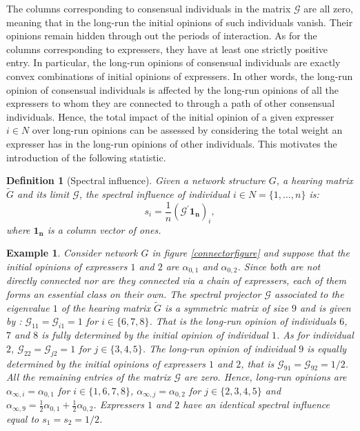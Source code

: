 \documentclass{article}
\newtheorem{definition}{Definition}
\newtheorem{example}{Example}
\begin{document}
\vspace{3mm} 
The columns corresponding to consensual individuals in the matrix $\mathcal{G}$ are all zero, meaning that in the long-run the initial opinions of such individuals vanish. Their opinions remain hidden through out the periods of interaction. As for the columns corresponding to expressers, they have at least one strictly positive entry.  In particular, the long-run opinions of consensual individuals are exactly convex combinations of initial opinions of expressers. In other words, the long-run opinion of consensual individuals is affected by the long-run opinions of all the expressers to whom they are connected to through a path of other consensual individuals. Hence, the total impact of the initial opinion of a given expresser $ i \in N$ over long-run opinions can be assessed by considering the total weight an expresser has in the long-run opinions of other individuals. This motivates the introduction of the following statistic. 

\begin{definition}[Spectral influence] Given a network structure $G$, a hearing matrix $\tilde{G}$ and its limit $\mathcal{G}$, the spectral influence of individual $i \in N =\{1 , \ldots , n \}$ is:
\begin{equation*}
s_i = \frac{1}{n} (\mathcal{G}^{'} \mathbf{1_n})_i,
\end{equation*}
where $\mathbf{1_n}$ is a column vector of ones.
\label{spectralinfluence}
\end{definition}
\begin{example} Consider network $G$ in figure \ref{connectorfigure} and suppose that the initial opinions of expressers $1$ and $2$ are $\alpha_{0,1}$ and $\alpha_{0,2}$. Since both are not directly connected nor are they connected via a chain of expressers, each of them forms an essential class on their own. The spectral projector $\mathcal{G}$ associated to the eigenvalue $1$ of the hearing matrix $\tilde{G}$ is a symmetric matrix of size $9$ and is given by : $\mathcal{G}_{11} =  \mathcal{G}_{i1} = 1$ for $i \in \{6,7,8 \}$. That is the long-run opinion of individuals $6$, $7$ and $8$ is fully determined by the initial opinion of individual $1$. As for individual $2$,  $\mathcal{G}_{22} =  \mathcal{G}_{j2} = 1$ for $j \in \{3,4,5 \}$. The long-run opinion of individual $9$ is equally determined by the initial opinions of expressers $1$ and $2$, that is $ \mathcal{G}_{91} = \mathcal{G}_{92} = 1/2$. All the remaining entries of the matrix $\mathcal{G}$ are zero. Hence, long-run opinions are $\alpha_{\infty, i} = \alpha_{0,1}$ for $i \in \{1,6,7,8 \}$, $\alpha_{\infty, j} = \alpha_{0,2}$ for $j \in \{2,3,4,5 \}$ and $\alpha_{\infty, 9} = \frac{1}{2} \alpha_{0,1}  + \frac{1}{2} \alpha_{0,2}$. Expressers $1$ and $2$ have an identical spectral influence equal to $s_1 = s_2 = 1/2$.  
\end{example}
%
\end{document}

